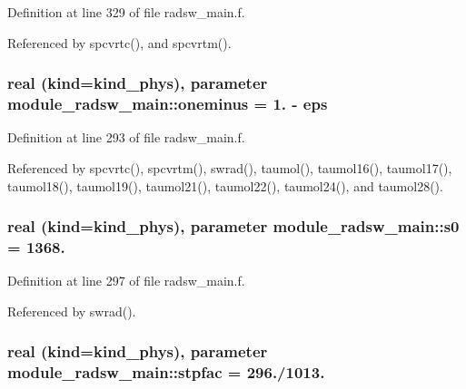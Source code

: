 Definition at line 329 of file radsw\+\_\+main.\+f.



Referenced by spcvrtc(), and spcvrtm().

\subsubsection[{\texorpdfstring{oneminus}{oneminus}}]{\setlength{\rightskip}{0pt plus 5cm}real (kind=kind\+\_\+phys), parameter module\+\_\+radsw\+\_\+main\+::oneminus = 1. -\/ {\bf eps}\hspace{0.3cm}{\ttfamily [private]}}\hypertarget{namespacemodule__radsw__main_ac666738c31ea648cae506a47e5a4e43d}{}\label{namespacemodule__radsw__main_ac666738c31ea648cae506a47e5a4e43d}


Definition at line 293 of file radsw\+\_\+main.\+f.



Referenced by spcvrtc(), spcvrtm(), swrad(), taumol(), taumol16(), taumol17(), taumol18(), taumol19(), taumol21(), taumol22(), taumol24(), and taumol28().

\subsubsection[{\texorpdfstring{s0}{s0}}]{\setlength{\rightskip}{0pt plus 5cm}real (kind=kind\+\_\+phys), parameter module\+\_\+radsw\+\_\+main\+::s0 = 1368.\hspace{0.3cm}{\ttfamily [private]}}\hypertarget{namespacemodule__radsw__main_a244c149eb05c0675a7e040dbf7e2bc4b}{}\label{namespacemodule__radsw__main_a244c149eb05c0675a7e040dbf7e2bc4b}


Definition at line 297 of file radsw\+\_\+main.\+f.



Referenced by swrad().

\subsubsection[{\texorpdfstring{stpfac}{stpfac}}]{\setlength{\rightskip}{0pt plus 5cm}real (kind=kind\+\_\+phys), parameter module\+\_\+radsw\+\_\+main\+::stpfac = 296./1013.\hspace{0.3cm}{\ttfamily [private]}}\hypertarget{namespacemodule__radsw__main_a4d32ea8f0f1bca37e3351a5ae5077f77}{}\label{namespacemodule__radsw__main_a4d32ea8f0f1bca37e3351a5ae5077f77}


